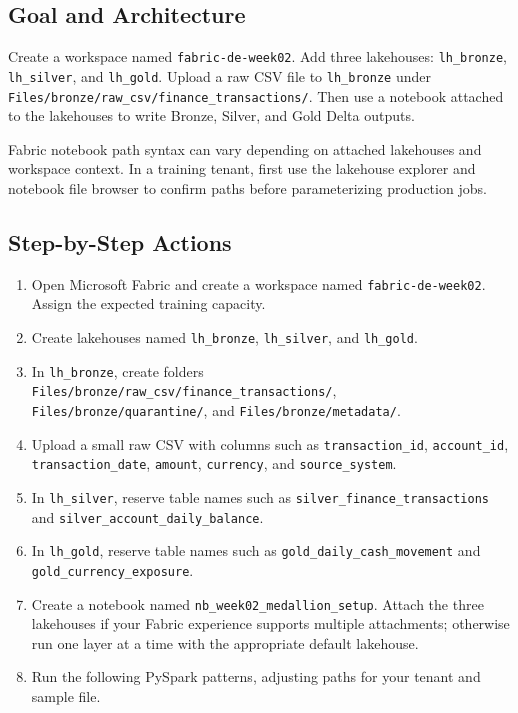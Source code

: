 \subsection{Goal and Architecture}
Create a workspace named \texttt{fabric-de-week02}. Add three lakehouses: \texttt{lh\_bronze}, \texttt{lh\_silver}, and \texttt{lh\_gold}. Upload a raw CSV file to \texttt{lh\_bronze} under \texttt{Files/bronze/raw\_csv/finance\_transactions/}. Then use a notebook attached to the lakehouses to write Bronze, Silver, and Gold Delta outputs.

\begin{notebox}
Fabric notebook path syntax can vary depending on attached lakehouses and workspace context. In a training tenant, first use the lakehouse explorer and notebook file browser to confirm paths before parameterizing production jobs.
\end{notebox}

\subsection{Step-by-Step Actions}
\begin{enumerate}
    \item Open Microsoft Fabric and create a workspace named \texttt{fabric-de-week02}. Assign the expected training capacity.
    \item Create lakehouses named \texttt{lh\_bronze}, \texttt{lh\_silver}, and \texttt{lh\_gold}.
    \item In \texttt{lh\_bronze}, create folders \texttt{Files/bronze/raw\_csv/finance\_transactions/}, \texttt{Files/bronze/quarantine/}, and \texttt{Files/bronze/metadata/}.
    \item Upload a small raw CSV with columns such as \texttt{transaction\_id}, \texttt{account\_id}, \texttt{transaction\_date}, \texttt{amount}, \texttt{currency}, and \texttt{source\_system}.
    \item In \texttt{lh\_silver}, reserve table names such as \texttt{silver\_finance\_transactions} and \texttt{silver\_account\_daily\_balance}.
    \item In \texttt{lh\_gold}, reserve table names such as \texttt{gold\_daily\_cash\_movement} and \texttt{gold\_currency\_exposure}.
    \item Create a notebook named \texttt{nb\_week02\_medallion\_setup}. Attach the three lakehouses if your Fabric experience supports multiple attachments; otherwise run one layer at a time with the appropriate default lakehouse.
    \item Run the following PySpark patterns, adjusting paths for your tenant and sample file.
\end{enumerate}

